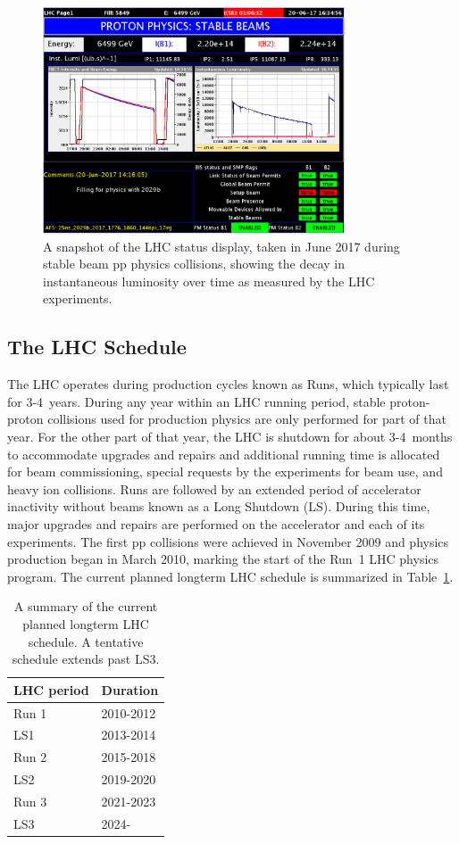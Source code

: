 \begin{figure}[!htb]
	\centering
	\includegraphics[width=0.80\textwidth]{figures/lhc_fill_decay}
	\caption{A snapshot of the LHC status display, taken in June 2017 during stable beam pp physics collisions, showing the decay in instantaneous luminosity over time as measured by the LHC experiments.}
	\label{fig:lhc_fill_decay}
\end{figure}


\subsection{The LHC Schedule}

The LHC operates during production cycles known as Runs, which typically last for 3-4~years. During any year within an LHC running period, stable proton-proton collisions used for production physics are only performed for part of that year. For the other part of that year, the LHC is shutdown for about 3-4~months to accommodate upgrades and repairs and additional running time is allocated for beam commissioning, special requests by the experiments for beam use, and heavy ion collisions. Runs are followed by an extended period of accelerator inactivity without beams known as a Long Shutdown (LS). During this time, major upgrades and repairs are performed on the accelerator and each of its experiments. The first pp collisions were achieved in November 2009 and physics production began in March 2010, marking the start of the Run~1 LHC physics program. The current planned longterm LHC schedule is summarized in Table~\ref{tab:LHC_schedule}.

\begin{table}[htbp!]
	\caption{A summary of the current planned longterm LHC schedule. A tentative schedule extends past LS3.}
	\label{tab:LHC_schedule}
	\centering
  \vspace{\baselineskip}
	\begin{tabular}{ll}
	\hline \hline
	LHC period & Duration \\
	\hline
	Run 1 & 2010-2012 \\
	LS1   & 2013-2014 \\
	Run 2 & 2015-2018 \\
	LS2   & 2019-2020 \\
	Run 3 & 2021-2023 \\
	LS3   & 2024- \\
	\hline \hline
	\end{tabular}
\end{table}

